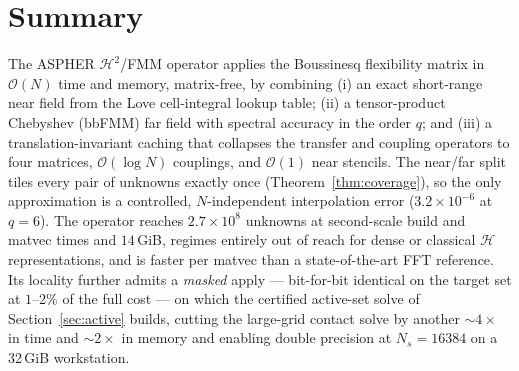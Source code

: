 \documentclass[11pt,a4paper]{article}
\newcommand{\Order}{\mathcal{O}}
\newcommand{\Htwo}{\mathcal{H}^2}
\newcommand{\Hmat}{\mathcal{H}}
\theoremstyle{definition}
\theoremstyle{remark}
\begin{document}
\section*{Summary}
The ASPHER $\Htwo$/FMM operator applies the Boussinesq flexibility matrix in
$\Order(N)$ time and memory, matrix-free, by combining (i) an exact short-range
near field from the Love cell-integral lookup table; (ii) a tensor-product
Chebyshev (bbFMM) far field with spectral accuracy in the order $q$; and (iii) a
translation-invariant caching that collapses the transfer and coupling operators
to four matrices, $\Order(\log N)$ couplings, and $\Order(1)$ near stencils. The
near/far split tiles every pair of unknowns exactly once
(Theorem~\ref{thm:coverage}), so the only approximation is a controlled,
$N$-independent interpolation error ($3.2\times10^{-6}$ at $q=6$). The operator
reaches $2.7\times10^8$ unknowns at second-scale build and matvec times and
$14$\,GiB, regimes entirely out of reach for dense or classical $\Hmat$
representations, and is faster per matvec than a state-of-the-art FFT reference.
Its locality further admits a \emph{masked} apply --- bit-for-bit identical on
the target set at $1$--$2\%$ of the full cost --- on which the certified
active-set solve of Section~\ref{sec:active} builds, cutting the large-grid
contact solve by another ${\sim}4\times$ in time and ${\sim}2\times$ in memory
and enabling double precision at $N_s=16384$ on a 32\,GiB workstation.



\end{document}
